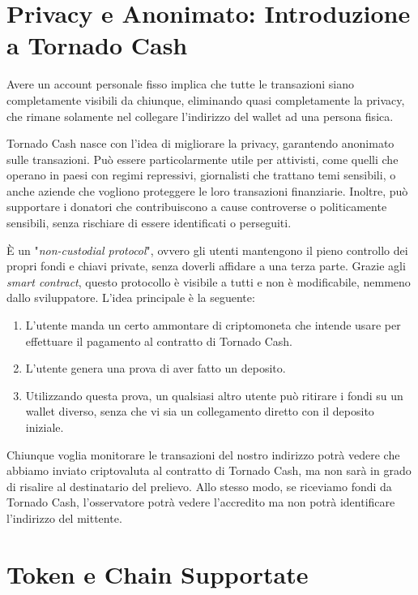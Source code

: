 \section{Privacy e Anonimato: Introduzione a Tornado Cash}

Avere un account personale fisso implica che tutte le transazioni siano completamente visibili da chiunque, eliminando quasi completamente la privacy, che rimane solamente nel collegare l'indirizzo del wallet ad una persona fisica.

Tornado Cash nasce con l'idea di migliorare la privacy, garantendo anonimato sulle transazioni. Può essere particolarmente utile per attivisti, come quelli che operano in paesi con regimi repressivi, giornalisti che trattano temi sensibili, o anche aziende che vogliono proteggere le loro transazioni finanziarie. Inoltre, può supportare i donatori che contribuiscono a cause controverse o politicamente sensibili, senza rischiare di essere identificati o perseguiti.

È un "\textit{non-custodial protocol}", ovvero gli utenti mantengono il pieno controllo dei propri fondi e chiavi private, senza doverli affidare a una terza parte. Grazie agli \textit{smart contract}, questo protocollo è visibile a tutti e non è modificabile, nemmeno dallo sviluppatore. L'idea principale è la seguente:

\begin{enumerate}
    \item L'utente manda un certo ammontare di criptomoneta che intende usare per effettuare il pagamento al contratto di Tornado Cash.
    \item L'utente genera una prova di aver fatto un deposito.
    \item Utilizzando questa prova, un qualsiasi altro utente può ritirare i fondi su un wallet diverso, senza che vi sia un collegamento diretto con il deposito iniziale.
\end{enumerate}

Chiunque voglia monitorare le transazioni del nostro indirizzo potrà vedere che abbiamo inviato criptovaluta al contratto di Tornado Cash, ma non sarà in grado di risalire al destinatario del prelievo. Allo stesso modo, se riceviamo fondi da Tornado Cash, l'osservatore potrà vedere l'accredito ma non potrà identificare l'indirizzo del mittente.

\section{Token e Chain Supportate}

